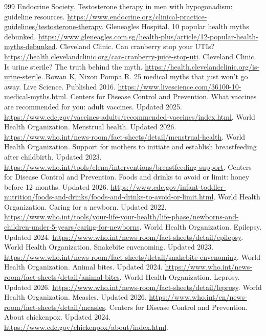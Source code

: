 \documentclass[11pt,oneside]{book}
\begin{document}
\begin{thebibliography}{999}
Endocrine Society. Testosterone therapy in men with hypogonadism: guideline resources. \url{https://www.endocrine.org/clinical-practice-guidelines/testosterone-therapy}.
Gleneagles Hospital. 10 popular health myths debunked. \url{https://www.gleneagles.com.sg/health-plus/article/12-popular-health-myths-debunked}.
Cleveland Clinic. Can cranberry stop your UTIs? \url{https://health.clevelandclinic.org/can-cranberry-juice-stop-uti}.
Cleveland Clinic. Is urine sterile? The truth behind the myth. \url{https://health.clevelandclinic.org/is-urine-sterile}.
Rowan K, Nixon Pompa R. 25 medical myths that just won't go away. Live Science. Published 2016. \url{https://www.livescience.com/36100-10-medical-myths.html}.
Centers for Disease Control and Prevention. What vaccines are recommended for you: adult vaccines. Updated 2025. \url{https://www.cdc.gov/vaccines-adults/recommended-vaccines/index.html}.
World Health Organization. Menstrual health. Updated 2026. \url{https://www.who.int/news-room/fact-sheets/detail/menstrual-health}.
World Health Organization. Support for mothers to initiate and establish breastfeeding after childbirth. Updated 2023. \url{https://www.who.int/tools/elena/interventions/breastfeeding-support}.
Centers for Disease Control and Prevention. Foods and drinks to avoid or limit: honey before 12 months. Updated 2026. \url{https://www.cdc.gov/infant-toddler-nutrition/foods-and-drinks/foods-and-drinks-to-avoid-or-limit.html}.
World Health Organization. Caring for a newborn. Updated 2022. \url{https://www.who.int/tools/your-life-your-health/life-phase/newborns-and-children-under-5-years/caring-for-newborns}.
World Health Organization. Epilepsy. Updated 2024. \url{https://www.who.int/news-room/fact-sheets/detail/epilepsy}.
World Health Organization. Snakebite envenoming. Updated 2023. \url{https://www.who.int/news-room/fact-sheets/detail/snakebite-envenoming}.
World Health Organization. Animal bites. Updated 2024. \url{https://www.who.int/news-room/fact-sheets/detail/animal-bites}.
World Health Organization. Leprosy. Updated 2026. \url{https://www.who.int/news-room/fact-sheets/detail/leprosy}.
World Health Organization. Measles. Updated 2026. \url{https://www.who.int/en/news-room/fact-sheets/detail/measles}.
Centers for Disease Control and Prevention. About chickenpox. Updated 2024. \url{https://www.cdc.gov/chickenpox/about/index.html}.

\end{thebibliography}
\end{document}
